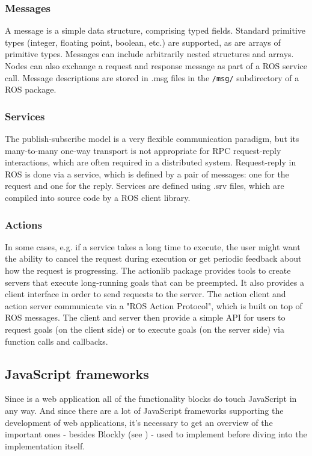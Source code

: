 \subsubsection{Messages}
A message is a simple data structure, comprising typed fields. Standard primitive types (integer, floating point, boolean, etc.) are supported, as are arrays of primitive types. Messages can include arbitrarily nested structures and arrays. Nodes can also exchange a request and response message as part of a ROS service call. Message descriptions are stored in .msg files in the \lstinline!/msg/! subdirectory of a ROS package.

\subsubsection{Services}
The publish-subscribe model is a very flexible communication paradigm, but its many-to-many one-way transport is not appropriate for RPC request-reply interactions, which are often required in a distributed system. Request-reply in ROS is done via a service, which is defined by a pair of messages: one for the request and one for the reply. Services are defined using .srv files, which are compiled into source code by a ROS client library.

\subsubsection{Actions}
In some cases, e.g. if a service takes a long time to execute, the user might want the ability to cancel the request during execution or get periodic feedback about how the request is progressing. The actionlib package provides tools to create servers that execute long-running goals that can be preempted. It also provides a client interface in order to send requests to the server.
The action client and action server communicate via a "ROS Action Protocol", which is built on top of ROS messages. The client and server then provide a simple API for users to request goals (on the client side) or to execute goals (on the server side) via function calls and callbacks.

\subsection{JavaScript frameworks} \label{sub:jsFrameworks}
Since \toolname{} is a web application all of the functionality blocks do touch JavaScript in any way. And since there are a lot of JavaScript frameworks supporting the development of web applications, it's necessary to get an overview of the important ones - besides Blockly (see ) - used to implement \toolname{} before diving into the implementation itself.

